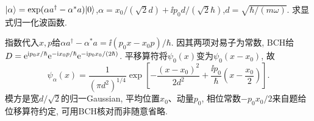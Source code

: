 \begin{exercise}
$\lvert \alpha\rangle=\exp(\alpha a^\dagger-\alpha^*a)\lvert 0\rangle$,$\alpha=x_0/(\sqrt2d)+\ii p_0d/(\sqrt2\hbar)$,$d=\sqrt{\hbar/(m\omega)}$. 求显式归一化波函数.
\end{exercise}
\begin{solution}
指数代入$x,p$给$\alpha a^\dagger-\alpha^*a=\ii(p_0x-x_0p)/\hbar$. 因其两项对易子为常数, BCH给$D=\mathrm e^{\mathrm i p_0x/\hbar}\mathrm e^{-\mathrm i x_0p/\hbar}\mathrm e^{-\mathrm i p_0x_0/(2\hbar)}$. 平移算符将$\psi_0(x)$变为$\psi_0(x-x_0)$, 故
\[
\psi_\alpha(x)=\frac1{(\pi d^2)^{1/4}}\exp\!\left[-\frac{(x-x_0)^2}{2d^2}+\frac{\ii p_0}{\hbar}\left(x-\frac{x_0}{2}\right)\right].
\]
模方是宽$d/\sqrt2$的归一Gaussian, 平均位置$x_0$、动量$p_0$, 相位常数$-p_0x_0/2$来自题给位移算符约定, 可用BCH核对而非随意省略.
\end{solution}
